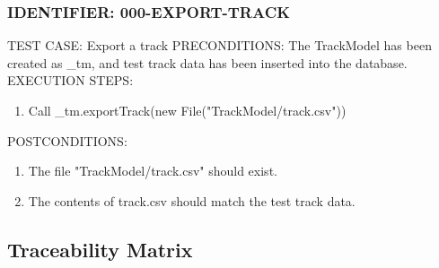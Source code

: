 \documentclass{scrreprt}
\begin{document}
\subsubsection{IDENTIFIER: 000-EXPORT-TRACK}
TEST CASE: Export a track
PRECONDITIONS: The TrackModel has been created as _tm, and test track data has been inserted into the database.
EXECUTION STEPS:
\begin{enumerate}
	\item Call _tm.exportTrack(new File("TrackModel/track.csv"))
\end{enumerate}
POSTCONDITIONS:
\begin{enumerate}
	\item The file "TrackModel/track.csv" should exist.
	\item The contents of track.csv should match the test track data.
\end{enumerate}

\subsection{Traceability Matrix}
\end{document}

